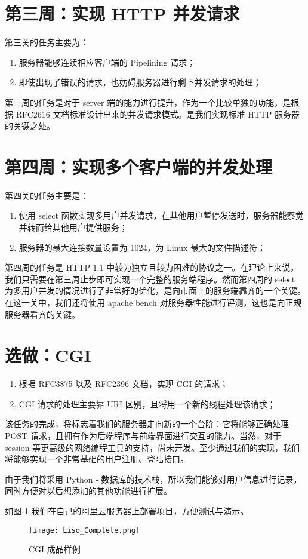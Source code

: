 \section{第三周：实现 HTTP 并发请求} 第三关的任务主要为：
\begin{enumerate}
    \item 服务器能够连续相应客户端的 Pipelining 请求； 
    \item 即使出现了错误的请求，也妨碍服务器进行剩下并发请求的处理；
\end{enumerate}

第三周的任务是对于 server 端的能力进行提升，作为一个比较单独的功能，是根据 RFC2616 文档标准设计出来的并发请求模式。是我们实现标准 HTTP 服务器的关键之处。

\section{第四周：实现多个客户端的并发处理} 第四关的任务主要是：
\begin{enumerate}
    \item 使用 select 函数实现多用户并发请求，在其他用户暂停发送时，服务器能察觉并转而给其他用户提供服务；
    \item 服务器的最大连接数量设置为 1024，为 Linux 最大的文件描述符；
\end{enumerate}

第四周的任务是 HTTP 1.1 中较为独立且较为困难的协议之一。在理论上来说，我们只需要在第三周止步即可实现一个完整的服务端程序。然而第四周的 select 为多用户并发的情况进行了非常好的优化，是向市面上的服务端靠齐的一个关键。在这一关中，我们还将使用 apache bench 对服务器性能进行评测，这也是向正规服务器看齐的关键。

\section{选做：CGI}
\begin{enumerate}
    \item 根据 RFC3875 以及 RFC2396 文档，实现 CGI 的请求；
    \item CGI 请求的处理主要靠 URI 区别，且将用一个新的线程处理该请求；
\end{enumerate}

该任务的完成，将标志着我们的服务器走向新的一个台阶：它将能够正确处理 POST 请求，且拥有作为后端程序与前端界面进行交互的能力。当然，对于 session 等更高级的网络编程工具的支持，尚未开发。至少通过我们的实现，我们将能够实现一个非常基础的用户注册、登陆接口。

由于我们将采用 Python - 数据库的技术栈，所以我们能够对用户信息进行记录，同时方便对以后想添加的其他功能进行扩展。

如图 \ref{fig:cgi1} 我们在自己的阿里云服务器上部署项目，方便测试与演示。

\begin{figure}[htbp!]
    \centering
    \texttt{[image: Liso\_Complete.png]}
    \caption{CGI 成品样例}\label{fig:cgi1}
\end{figure}




